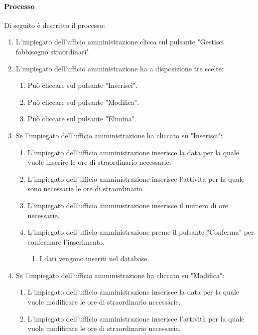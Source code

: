 \paragraph{Processo}
Di seguito è descritto il processo:
\begin{enumerate}
	\item L'impiegato dell'ufficio amministrazione clicca sul pulsante "Gestisci fabbisogno straordinari".
	\item L'impiegato dell'ufficio amministrazione ha a disposizione tre scelte:
		\begin{enumerate}
			\item Può cliccare sul pulsante "Inserisci".
			\item Può cliccare sul pulsante "Modifica".
			\item Può cliccare sul pulsante "Elimina".
		\end{enumerate}	
	\item Se l'impiegato dell'ufficio amministrazione ha cliccato su "Inserisci":
		\begin{enumerate}
			\item L'impiegato dell'ufficio amministrazione inserisce la data per la quale vuole inserire le ore di straordinario necessarie.
			\item L'impiegato dell'ufficio amministrazione inserisce l'attività per la quale sono necessarie le ore di straordinario.
			\item L'impiegato dell'ufficio amministrazione inserisce il numero di ore necessarie.
			\item L'impiegato dell'ufficio amministrazione preme il pulsante "Conferma" per confermare l'inserimento.
				\begin{enumerate}
					\item I dati vengono inseriti nel database.
				\end{enumerate}
		\end{enumerate}
	\item Se l'impiegato dell'ufficio amministrazione ha cliccato su "Modifica":
		\begin{enumerate}
			\item L'impiegato dell'ufficio amministrazione inserisce la data per la quale vuole modificare le ore di straordinario necessarie.
			\item L'impiegato dell'ufficio amministrazione inserisce l'attività per la quale vuole modificare le ore di straordinario necessarie.
				\begin{enumerate}

\end{enumerate}
\end{enumerate}
\end{enumerate}
